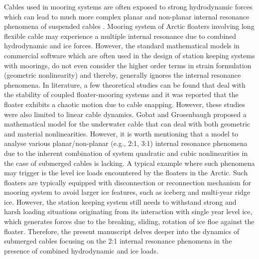 \documentclass[review]{elsarticle}
\begin{document}
Cables used in mooring systems are often exposed to strong hydrodynamic forces which can lead to much more complex planar and non-planar internal resonance phenomena of suspended cables \cite{Iyengar_1988}. Mooring system of Arctic floaters involving long flexible cable may experience a multiple internal resonance due to combined hydrodynamic and ice forces. However, the standard mathematical models in commercial software which are often used in the design of station keeping systems with moorings, do not even consider the higher order terms in strain formulation (geometric nonlinearity) and thereby, generally ignores the internal resonance phenomena. In literature, a few theoretical studies \cite{Howell_1993, Zhu_1999} can be found that deal with the stability of coupled floater-mooring systems and it was reported that the floater exhibits a chaotic motion due to cable snapping. However, these studies were also limited to linear cable dynamics. Gobat and Grosenbaugh \cite{Gobat_2006} proposed a mathematical model for the underwater cable that can deal with both geometric and material nonlinearities. However, it is worth mentioning that a model to analyse various planar/non-planar (e.g., 2:1, 3:1) internal resonance phenomena due to the inherent combination of system quadratic and cubic nonlinearities in the case of submerged cables is lacking. A typical example where such phenomena may trigger is the level ice loads encountered by the floaters in the Arctic. Such floaters are typically equipped with disconnection or reconnection mechanism for mooring system to avoid larger ice features, such as iceberg and multi-year ridge ice. However, the station keeping system still needs to withstand strong and harsh loading situations originating from its interaction with single year level ice, which generates forces due to the breaking, sliding, rotation of ice floe against the floater. Therefore, the present manuscript delves deeper into the dynamics of submerged cables focusing on the 2:1 internal resonance phenomena in the presence of combined hydrodynamic and ice loads.

\end{document}
